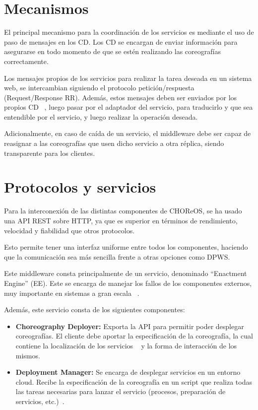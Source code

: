 \documentclass[runningheads]{llncs}
\begin{document}
\section{Mecanismos}
El principal mecanismo para la coordinación de los servicios es mediante el uso de paso de mensajes en los CD. Los CD se encargan de enviar información para asegurarse en todo momento de que se estén realizando las coreografías correctamente. 

Los mensajes propios de los servicios para realizar la tarea deseada en un sistema web, se intercambian siguiendo el protocolo petición/respuesta (Request/Response RR). Además, estos mensajes deben ser enviados por los propios CD ~\cite{a_2}, luego pasar por el adaptador del servicio, para traducirlo y que sea entendible por el servicio, y luego realizar la operación deseada.

Adicionalmente, en caso de caída de un servicio, el middleware debe ser capaz de reasignar a las coreografías que usen dicho servicio a otra réplica, siendo transparente para los clientes.
\section{Protocolos y servicios}
Para la interconexión de las distintas componentes de CHOReOS, se ha usado una API REST sobre HTTP, ya que es superior en términos de rendimiento, velocidad y fiabilidad que otros protocolos.~\cite{a_128}

Esto permite tener una interfaz uniforme entre todos los componentes, haciendo que la comunicación sea más sencilla frente a otras opciones como DPWS. ~\cite{a_128}

Este middleware consta principalmente de un servicio, denominado ``Enactment Engine'' (EE). Este se encarga de manejar los fallos de los componentes externos, muy importante en sistemas a gran escala ~\cite{a_128}.

Además, este servicio consta de los siguientes componentes:

\begin{itemize}
    \item \textbf{Choreography Deployer: }Exporta la API para permitir poder desplegar coreografías. El cliente debe aportar la especificación de la coreografía, la cual contiene la localización de los servicios ~\cite{a_128} y la forma de interacción de los mismos.
    \item \textbf{Deployment Manager: }Se encarga de desplegar servicios en un entorno cloud. Recibe la especificación de la coreografía en un script que realiza todas las tareas necesarias para lanzar el servicio (procesos, preparación de servicios, etc.)~\cite{a_128}.
\end{itemize}
\end{document}
